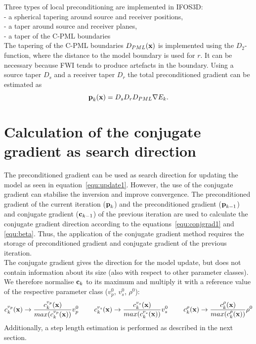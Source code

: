 Three types of local preconditioning are implemented in IFOS3D:\\
- a spherical tapering around source and receiver positions,\\
- a taper around source and receiver planes,  \\
- a taper of the C-PML boundaries\\
The tapering of the C-PML boundaries $D_{PML}(\textbf x)$ is implemented using the $D_2$-function, where the distance to the model boundary is used for $r$. It can be necessary because FWI tends to produce artefacts in the boundary. Using a source taper $D_s$ and a receiver taper $D_r$ the total preconditioned gradient can be estimated as 
\begin{equation} \textbf{p}_k(\textbf x)=D_sD_rD_{PML}\nabla E_k.\end{equation}

\section{Calculation of the conjugate gradient as search direction}
The preconditioned gradient can be used as search direction for updating the model as seen in equation~\ref{equ:update1}. However, the use of the conjugate gradient can stabilise the inversion and improve convergence. The preconditioned gradient of the current iteration ($\textbf p_k$) and the preconditioned gradient ($\textbf p_{k-1}$) and conjugate gradient ($\textbf c_{k-1}$) of the previous iteration are used to calculate the conjugate gradient direction according to the equations~\ref{equ:conjgrad1} and \ref{equ:beta}. Thus, the application of the conjugate gradient method requires the storage of preconditioned gradient and conjugate gradient of the previous iteration.\\
The conjugate gradient gives the direction for the model update, but does not contain information about its size (also with respect to other parameter classes). We therefore normalise  $\textbf c_{k}$ to its maximum and multiply it with a reference value of the respective parameter class ($v_p^0$, $v_s^0$, $\rho^0$): 
\begin{equation}
 c_k^{v_p}(\textbf x)\rightarrow\frac{c_k^{v_p}(\textbf x)}{max(c_k^{v_p}(\textbf x))}v_p^0 \hspace{0.8cm} c_k^{v_s}(\textbf x)\rightarrow\frac{c_k^{v_s}(\textbf x)}{max(c_k^{v_s}(\textbf x))}v_s^0  \hspace{0.8cm} c_k^{\rho}(\textbf x)\rightarrow\frac{c_k^{\rho}(\textbf x)}{max(c_k^{\rho}(\textbf x))}\rho^0 \label{equ:scaled_grad}
\end{equation}
Additionally, a step length estimation is performed as described in the next section.


